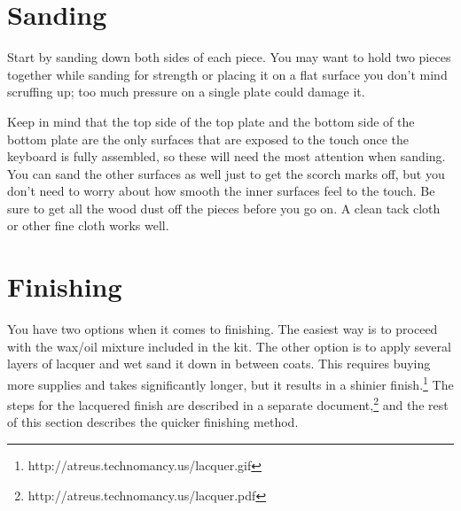 \documentclass{article}
\begin{document}
\section{Sanding}

Start by sanding down both sides of each piece. You may want to
hold two pieces together while sanding for strength or placing it on a
flat surface you don't mind scruffing up; too much pressure on a
single plate could damage it.

\vspace{1em}
\noindent{}
\vspace{1em}

Keep in mind that the top side of the top plate and the bottom side of
the bottom plate are the only surfaces that are exposed to the touch
once the keyboard is fully assembled, so these will need the most
attention when sanding. You can sand the other surfaces as well just
to get the scorch marks off, but you don't need to worry about how
smooth the inner surfaces feel to the touch. Be sure to get all the
wood dust off the pieces before you go on. A clean tack cloth or other
fine cloth works well.

\section{Finishing}

You have two options when it comes to finishing. The easiest way is to
proceed with the wax/oil mixture included in the kit. The other option
is to apply several layers of lacquer and wet sand it down in
between coats. This requires buying more supplies and takes significantly
longer, but it results in a shinier
finish.\footnote{http://atreus.technomancy.us/lacquer.gif} The steps
for the lacquered finish are described in a separate
document,\footnote{http://atreus.technomancy.us/lacquer.pdf} and the
rest of this section describes the quicker finishing method.
\end{document}
